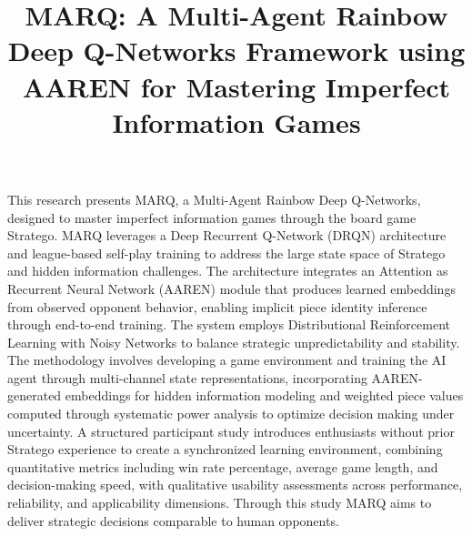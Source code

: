 \documentclass[oneside]{etd}
\title{MARQ: A Multi-Agent Rainbow Deep Q-Networks Framework using AAREN for Mastering Imperfect Information Games}
\def\maketitle{}%
\def\makerecomm{}%
\def\makeacceptance{}%
\def\makedeclaration{}%
\renewenvironment{abstract}{\comment}{\endcomment}%
\begin{document}
\maketitle
\makerecomm
\makeacceptance
\makedeclaration

\begin{abstract}
This research presents MARQ, a Multi-Agent Rainbow Deep Q-Networks, designed to master imperfect information games through the board game Stratego. MARQ leverages a Deep Recurrent Q-Network (DRQN) architecture and league-based self-play training to address the large state space of Stratego and hidden information challenges. The architecture integrates an Attention as Recurrent Neural Network (AAREN) module that produces learned embeddings from observed opponent behavior, enabling implicit piece identity inference through end-to-end training. The system employs Distributional Reinforcement Learning with Noisy Networks to balance strategic unpredictability and stability. The methodology involves developing a game environment and training the AI agent through multi-channel state representations, incorporating AAREN-generated embeddings for hidden information modeling and weighted piece values computed through systematic power analysis to optimize decision making under uncertainty. A structured participant study introduces enthusiasts without prior Stratego experience to create a synchronized learning environment, combining quantitative metrics including win rate percentage, average game length, and decision-making speed, with qualitative usability assessments across performance, reliability, and applicability dimensions. Through this study MARQ aims to deliver strategic decisions comparable to human opponents.
\end{abstract}


\beginbody
{}







% 
% 
% 

%   
%   
%   
%   
%   

\nocite{*}

{
\singlespace

}

% 
\end{document}
